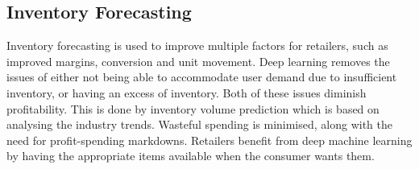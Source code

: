 \documentclass{article}
\begin{document}
\subsection{Inventory Forecasting}
Inventory forecasting is used to improve multiple factors for retailers, such as improved margins, conversion and unit movement. Deep learning removes the issues of either not being able to accommodate user demand due to insufficient inventory, or having an excess of inventory. Both of these issues diminish profitability. This is done by inventory volume prediction which is based on analysing the industry trends. Wasteful spending is minimised, along with the need for profit-spending markdowns. Retailers benefit from deep machine learning by having the appropriate items available when the consumer wants them.\cite{201710170500PR.NEWS.USPR.MN1534920171017}
\end{document}
